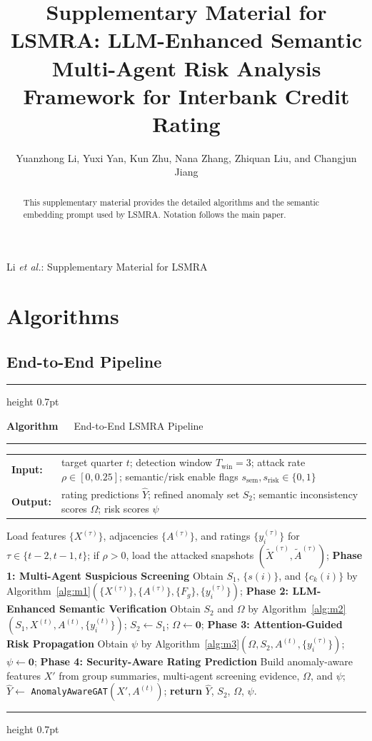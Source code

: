\documentclass[lettersize,journal]{IEEEtran}
\makeatletter
\newcommand{\algphase}[1]{\STATE \textbf{#1}}
\newcommand{\alghl}[1]{\texttt{#1}}
\newcommand{\algio}[2]{%
  \par\noindent
  \begin{tabular}{@{}l@{\hspace{0.4em}}>{%
    \RaggedRight\arraybackslash\hyphenpenalty=8000\exhyphenpenalty=8000%
  }p{\dimexpr\linewidth-1.35cm\relax}@{}}
  \textbf{Input:} & #1 \\[1.5pt]
  \textbf{Output:} & #2
  \end{tabular}%
  \par
}
\newcommand{\alghead}[1]{%
  \par\subsection{#1}\nopagebreak
}
\newcounter{algnum}
\newenvironment{algbox}[1]{%
  \par\nobreak\vspace{1pt}%
  \noindent\begin{minipage}{\linewidth}%
  \refstepcounter{algnum}%
  \noindent\hrule height 0.7pt\relax\par\nobreak\vspace{1.5pt}%
  \noindent\textbf{Algorithm~\thealgnum}~~#1\par\nobreak\vspace{0.5pt}%
  \noindent\hrule\relax\par\nobreak\vspace{1.5pt}%
  \begingroup\footnotesize\RaggedRight
  \hyphenpenalty=10000\exhyphenpenalty=10000
  \setlength{\parindent}{0pt}\setlength{\parskip}{0pt}\ignorespaces
}{%
  \par\endgroup
  \nobreak\vspace{1.5pt}%
  \noindent\hrule height 0.7pt\relax
  \end{minipage}%
  \par\vspace{8pt}%
}
\makeatother
\begin{document}
\title{Supplementary Material for\\
LSMRA: LLM-Enhanced Semantic Multi-Agent Risk Analysis Framework for Interbank Credit Rating}
\author{Yuanzhong Li, Yuxi Yan, Kun Zhu, Nana Zhang, Zhiquan Liu, and Changjun Jiang}
%
{Li \MakeLowercase{\textit{et al.}}: Supplementary Material for LSMRA}
\maketitle
\raggedbottom

\begin{abstract}
This supplementary material provides the detailed algorithms and the semantic embedding prompt used by LSMRA.
Notation follows the main paper.
\end{abstract}

\section{Algorithms}

\alghead{End-to-End Pipeline}
\begin{algbox}{End-to-End LSMRA Pipeline\label{alg:lsmra-e2e}}
\algio{%
target quarter $t$; detection window $T_{\mathrm{win}}=3$; attack rate $\rho\in[0,0.25]$; semantic/risk enable flags $s_{\mathrm{sem}},s_{\mathrm{risk}}\in\{0,1\}$%
}{%
rating predictions $\hat{Y}$; refined anomaly set $S_2$; semantic inconsistency scores $\Omega$; risk scores $\psi$%
}
\nopagebreak
\begin{algorithmic}[1]
\STATE Load features $\{X^{(\tau)}\}$, adjacencies $\{A^{(\tau)}\}$, and ratings $\{y_i^{(\tau)}\}$ for $\tau\in\{t{-}2,t{-}1,t\}$; if $\rho>0$, load the attacked snapshots $(\tilde{X}^{(\tau)},\tilde{A}^{(\tau)})$;
\algphase{Phase 1: Multi-Agent Suspicious Screening}
\STATE Obtain $S_1$, $\{s(i)\}$, and $\{c_k(i)\}$ by Algorithm~\ref{alg:m1}$(\{X^{(\tau)}\},\{A^{(\tau)}\},\{F_g\},\{y_i^{(\tau)}\})$;
\algphase{Phase 2: LLM-Enhanced Semantic Verification}
\STATE Obtain $S_2$ and $\Omega$ by Algorithm~\ref{alg:m2}$(S_1,X^{(t)},A^{(t)},\{y_i^{(t)}\})$;
\ELSE
\STATE $S_2 \leftarrow S_1$; $\Omega \leftarrow \mathbf{0}$;
\ENDIF
\algphase{Phase 3: Attention-Guided Risk Propagation}
\STATE Obtain $\psi$ by Algorithm~\ref{alg:m3}$(\Omega,S_2,A^{(t)},\{y_i^{(\tau)}\})$;
\ELSE
\STATE $\psi \leftarrow \mathbf{0}$;
\ENDIF
\algphase{Phase 4: Security-Aware Rating Prediction}
\STATE Build anomaly-aware features $X'$ from group summaries, multi-agent screening evidence, $\Omega$, and $\psi$;
\STATE $\hat{Y} \leftarrow$ \alghl{AnomalyAwareGAT}$(X',A^{(t)})$;
\STATE \textbf{return} $\hat{Y}$, $S_2$, $\Omega$, $\psi$.
\end{algorithmic}
\end{algbox}
\end{document}
